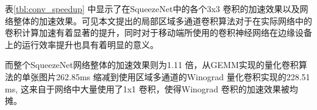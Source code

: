表\ref{tbl:conv_speedup} 中显示了在SqueezeNet中的各个3x3 卷积的加速效果以及网络整体的加速效果。可见本文提出的局部区域多通道卷积算法对于在实际网络中的卷积计算加速有着显著的提升，同时对于移动端所使用的卷积神经网络在边缘设备上的运行效率提升也具有着明显的意义。


而整个SqueezeNet网络整体的加速效果则为1.11 倍，从GEMM实现的量化卷积算法的单张图片262.85ms 缩减到使用区域多通道的Winograd 量化卷积实现的228.51 ms, 这来自于网络中大量使用了1x1 卷积，使得Winograd 卷积的加速效果被均摊。

\iffalse
\section{实验验证}

这一部分验证本文中实现的整数Winograd 快速卷积在嵌入式设别上的有效性，
包括
\begin{itemize}
  \item 针对单个卷积操作本身的执行效率，测量不同尺度规模的卷积输入下
    \begin{itemize}
        \item 该卷积实现同对应的全精度Winograd快速卷积的加速效果, 包括执行效率和内存开销(对照组为NNPACK实现)
        \item 该卷积实现同基于GEMM卷积方法的整数卷积效率对比(对照组为QNNPACK实现)
    \end{itemize}
  \item 针对于由此卷积操作构成的卷积网络在特定的视觉任务上的的执行性能和效率
    \begin{itemize}
        \item 同全精度网络的执行效率和准确率作对比加速效果存储开销和数值精度
        \item 同支持量化卷积计算的模型推理框架（TensorFlow lite， PyTorch Mobile）对比实现的准确率与加速效果
    \end{itemize}

\end{itemize}
\fi
